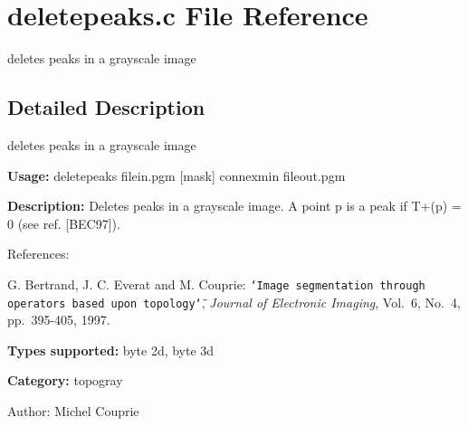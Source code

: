 \section{deletepeaks.c File Reference}
\label{deletepeaks_8c}
deletes peaks in a grayscale image  




\label{_details}
\subsection{Detailed Description}
deletes peaks in a grayscale image 

{\bf Usage:} deletepeaks filein.pgm [mask] connexmin fileout.pgm

{\bf Description:} Deletes peaks in a grayscale image. A point p is a peak if T+(p) = 0 (see ref. [BEC97]).

References:\par
 [BEC97] G. Bertrand, J. C. Everat and M. Couprie: {\tt \char`\"{}Image segmentation through operators based upon topology\char`\"{}}, {\em  Journal of Electronic Imaging\/}, Vol.~6, No.~4, pp.~395-405, 1997.\par


{\bf Types supported:} byte 2d, byte 3d

{\bf Category:} topogray

\begin{Desc}
\item[Author:]Michel Couprie \end{Desc}
